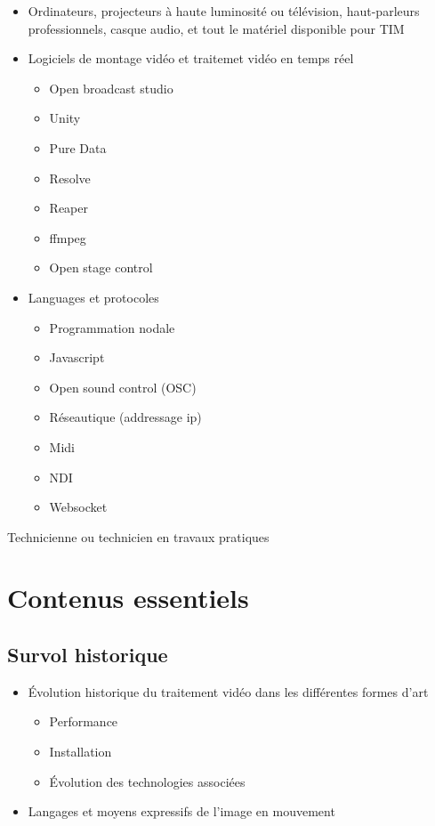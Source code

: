 \documentclass[
]{book}
\providecommand{\tightlist}{%
  \setlength{\itemsep}{0pt}\setlength{\parskip}{0pt}}
\begin{document}
\begin{itemize}
\tightlist
\item
  Ordinateurs, projecteurs à haute luminosité ou télévision, haut-parleurs professionnels, casque audio, et tout le matériel disponible pour TIM
\item
  Logiciels de montage vidéo et traitemet vidéo en temps réel

  \begin{itemize}
  \tightlist
  \item
    Open broadcast studio
  \item
    Unity
  \item
    Pure Data
  \item
    Resolve
  \item
    Reaper
  \item
    ffmpeg
  \item
    Open stage control
  \end{itemize}
\item
  Languages et protocoles

  \begin{itemize}
  \tightlist
  \item
    Programmation nodale
  \item
    Javascript
  \item
    Open sound control (OSC)
  \item
    Réseautique (addressage ip)
  \item
    Midi
  \item
    NDI
  \item
    Websocket
  \end{itemize}
\end{itemize}

Technicienne ou technicien en travaux pratiques

\hypertarget{contenus-essentiels}{%
\section{Contenus essentiels}\label{contenus-essentiels}}

\hypertarget{survol-historique}{%
\subsection{Survol historique}\label{survol-historique}}

\begin{itemize}
\tightlist
\item
  Évolution historique du traitement vidéo dans les différentes formes d'art

  \begin{itemize}
  \tightlist
  \item
    Performance
  \item
    Installation
  \item
    Évolution des technologies associées
  \end{itemize}
\item
  Langages et moyens expressifs de l'image en mouvement
\end{itemize}
\end{document}
